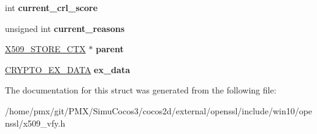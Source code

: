 \begin{DoxyCompactItemize}
int {\bfseries current\+\_\+crl\+\_\+score}
\item 
\mbox{\label{structx509__store__ctx__st_ae2ab9b215c63995eaef346e6a1fde845}} 
unsigned int {\bfseries current\+\_\+reasons}
\item 
\mbox{\label{structx509__store__ctx__st_a647b1547f675fde39774de2672fdbf69}} 
\hyperlink{structx509__store__ctx__st}{X509\+\_\+\+S\+T\+O\+R\+E\+\_\+\+C\+TX} $\ast$ {\bfseries parent}
\item 
\mbox{\label{structx509__store__ctx__st_a30a9b2bc4ea6479c2ce84b1a169cedd4}} 
\hyperlink{structcrypto__ex__data__st}{C\+R\+Y\+P\+T\+O\+\_\+\+E\+X\+\_\+\+D\+A\+TA} {\bfseries ex\+\_\+data}
\end{DoxyCompactItemize}


The documentation for this struct was generated from the following file\+:\begin{DoxyCompactItemize}
\item 
/home/pmx/git/\+P\+M\+X/\+Simu\+Cocos3/cocos2d/external/openssl/include/win10/openssl/x509\+\_\+vfy.\+h\end{DoxyCompactItemize}
